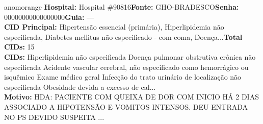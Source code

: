 \documentclass[a4paper,10pt]{article}
\begin{document}
\begin{anomalycard}[Interna\c{c}\~{a}o \#119795 | Pac. \#99351 | ALTO (z=4.18) | LOS: 7d | 26/02/2026\,$\to$\,05/03/2026]{anomorange}
\textbf{Hospital:} Hospital \#90816\quad \textbf{Fonte:} GHO-BRADESCO\quad \textbf{Senha:} 00000000000000000\quad \textbf{Guia:} ---\\

\textbf{CID Principal:} {\small Hipertensão essencial (primária), Hiperlipidemia não especificada, Diabetes mellitus não especificado - com coma, Doença...}\quad\textbf{Total CIDs:} 15\\

\textbf{CIDs:} {\scriptsize Hiperlipidemia não especificada \textbar{} Doença pulmonar obstrutiva crônica não especificada \textbar{} Acidente vascular cerebral, não especificado como hemorrágico ou isquêmico \textbar{} Exame médico geral \textbar{} Infecção do trato urinário de localização não especificada \textbar{} Obesidade devida a excesso de cal...}\\

\textbf{Motivo:} {\scriptsize HDA: PACIENTE COM QUEIXA DE DOR COM INICIO HÁ 2 DIAS ASSOCIADO A HIPOTENSÃO E VOMITOS INTENSOS. DEU ENTRADA NO PS DEVIDO SUSPEITA ...}\\




\end{anomalycard}
\end{document}
